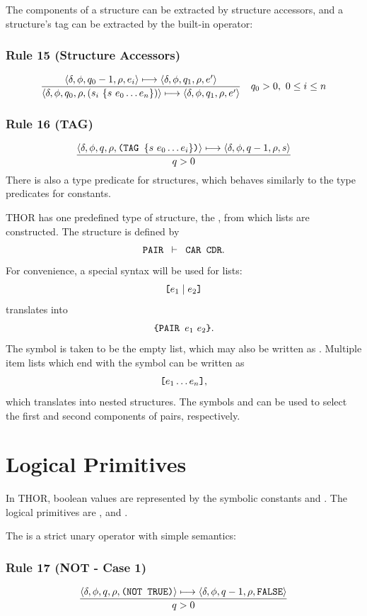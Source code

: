 The components of a structure can be extracted by structure accessors, and a
structure's tag can be extracted by the built-in  operator:

\subsubsection*{Rule 15 (Structure Accessors)}
\[
\frac{
\langle \delta,\phi,q_0-1,\rho,e_i\rangle\longmapsto
\langle \delta,\phi,q_1,\rho,e'\rangle
}{
\langle \delta,\phi,q_0,\rho,(s_i\ \{s\ e_0\ldots e_n\})\rangle\longmapsto
\langle \delta,\phi,q_1,\rho,e'\rangle
}
\quad q_0>0,\ 0\le i\le n
\]

\subsubsection*{Rule 16 (TAG)}
\[
\frac{\langle \delta,\phi,q,\rho,\texttt{(TAG }\{s\ e_0\ldots e_i\}\texttt{)}\rangle\longmapsto
      \langle \delta,\phi,q-1,\rho,s\rangle}
     {q>0}
\]
There is also a type predicate for structures, which behaves similarly to the
type predicates for constants.

THOR has one predefined type of structure, the , from which lists are
constructed. The  structure is defined by
\[
\texttt{PAIR }\vdash\texttt{ CAR CDR}.
\]
For convenience, a special syntax will be used for lists:
\[
\texttt{[}e_1\mid e_2\texttt{]}
\]
translates into
\[
\THOR{\{PAIR }e_1\ e_2\THOR{\}}.
\]
The symbol  is taken to be the empty list, which may also be written
as \THOR{[]}. Multiple item lists which end with the symbol  can be
written as
\[
\texttt{[}e_1\ldots e_n\texttt{]},
\]
which translates into nested  structures. The symbols  and
 can be used to select the first and second components of pairs,
respectively.

\section{Logical Primitives}

In THOR, boolean values are represented by the symbolic constants 
and . The logical primitives are ,  and
.

The  is a strict unary operator with simple semantics:

\subsubsection*{Rule 17 (NOT - Case 1)}
\[
\frac{\langle \delta,\phi,q,\rho,\texttt{(NOT TRUE)}\rangle\longmapsto
      \langle \delta,\phi,q-1,\rho,\texttt{FALSE}\rangle}
     {q>0}
\]

